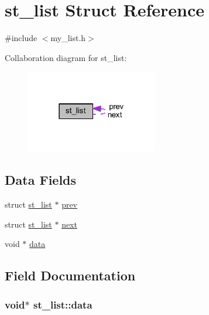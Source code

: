 \hypertarget{structst__list}{}\section{st\+\_\+list Struct Reference}
\label{structst__list}


{\ttfamily \#include $<$my\+\_\+list.\+h$>$}



Collaboration diagram for st\+\_\+list\+:\nopagebreak
\begin{figure}[H]
\begin{center}
\leavevmode
\includegraphics[width=162pt]{structst__list__coll__graph}
\end{center}
\end{figure}
\subsection*{Data Fields}
\begin{DoxyCompactItemize}
\item 
struct \hyperlink{structst__list}{st\+\_\+list} $\ast$ \hyperlink{structst__list_a53506b20583b3dfd486ff9f60f1450da}{prev}
\item 
struct \hyperlink{structst__list}{st\+\_\+list} $\ast$ \hyperlink{structst__list_a2df21777b3d410ab0803ee9046b3764e}{next}
\item 
void $\ast$ \hyperlink{structst__list_a178fcbad1f7324818b3da52be702e8dd}{data}
\end{DoxyCompactItemize}


\subsection{Field Documentation}
\hypertarget{structst__list_a178fcbad1f7324818b3da52be702e8dd}{}
\subsubsection[{data}]{\setlength{\rightskip}{0pt plus 5cm}void$\ast$ st\+\_\+list\+::data}\label{structst__list_a178fcbad1f7324818b3da52be702e8dd}
\hypertarget{structst__list_a2df21777b3d410ab0803ee9046b3764e}{}
